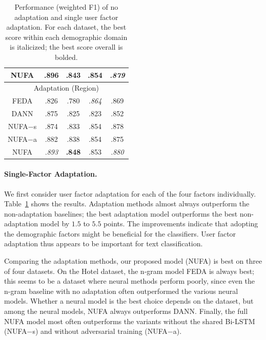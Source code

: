 \begin{table}[t!]
\begin{tabular}{c|c|c|c|c}
NUFA & \textbf{.896} & .843 & .854 & \em .879 \\ \hline
\multicolumn{5}{c}{Adaptation (Region)} \\\hline
FEDA & .826 & .780 & \em .864 & .869 \\
DANN & .875 & .825 & .823 & .852 \\\hline
NUFA$-$s & .874 & .833 & .854 & .878 \\
NUFA$-$a & .882 & .838 & .854 & .875 \\
NUFA & \em .893 & \textbf{.848} & .853 & \em .880\\ \hline
\end{tabular}
\caption{Performance (weighted F1) of no adaptation and single user factor adaptation.
For each dataset, the best score within each demographic domain is italicized; the best score overall is bolded.
}
\label{chap4:table:single}
\end{table}

\paragraph{Single-Factor Adaptation.} We first consider user factor adaptation for each of the four factors individually. 
Table~\ref{chap4:table:single} shows the results.
Adaptation methods almost always outperform the non-adaptation baselines;
the best adaptation model outperforms the best non-adaptation model by $1.5$ to $5.5$ points. 
The improvements indicate that adopting the demographic factors might be beneficial for the classifiers. User factor adaptation thus appears to be important for text classification. 

Comparing the adaptation methods,
our proposed model (NUFA) is best on three of four datasets.
On the Hotel dataset, the n-gram model FEDA is always best;
this seems to be a dataset where neural methods perform poorly, since even the n-gram baseline with no adaptation often outperformed the various neural models. 
Whether a neural model is the best choice depends on the dataset,
but among the neural models, NUFA always outperforms DANN.
Finally, the full NUFA model most often outperforms the variants without the shared Bi-LSTM (NUFA$-$s) and without adversarial training (NUFA$-$a). 


